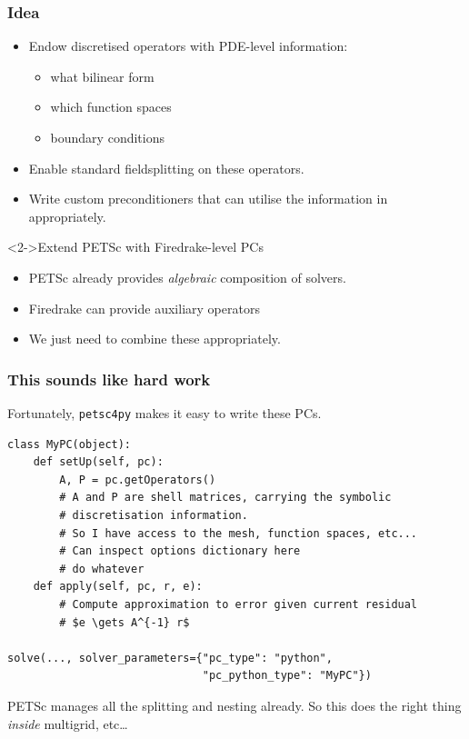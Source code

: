 \documentclass[presentation,aspectratio=43]{beamer}
\begin{document}
\begin{frame}
  \frametitle{Idea}
  \begin{itemize}
  \item Endow discretised operators with PDE-level information:
    \begin{itemize}
    \item what bilinear form
    \item which function spaces
    \item boundary conditions
    \end{itemize}
  \item Enable standard fieldsplitting on these operators.
  \item Write custom preconditioners that can utilise the information
    in appropriately.
  \end{itemize}
  \begin{block}<2->{Extend PETSc with Firedrake-level PCs}
  \begin{itemize}
  \item PETSc already provides \emph{algebraic} composition of solvers. \nocite{Brown:2012}

  \item Firedrake can provide auxiliary operators

  \item We just need to combine these appropriately.
  \end{itemize}
  \end{block}
\end{frame}

\begin{frame}[fragile]
  \frametitle{This sounds like hard work}
  Fortunately, \texttt{petsc4py} makes it easy to write these PCs.
\begin{verbatim}
class MyPC(object):
    def setUp(self, pc):
        A, P = pc.getOperators()
        # A and P are shell matrices, carrying the symbolic
        # discretisation information.
        # So I have access to the mesh, function spaces, etc...
        # Can inspect options dictionary here
        # do whatever
    def apply(self, pc, r, e):
        # Compute approximation to error given current residual
        # $e \gets A^{-1} r$

solve(..., solver_parameters={"pc_type": "python",
                              "pc_python_type": "MyPC"})
\end{verbatim}
  PETSc manages all the splitting and nesting already.  So this does
  the right thing \emph{inside} multigrid, etc\ldots
\end{frame}
\end{document}
